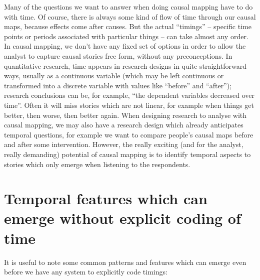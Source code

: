 \documentclass[
]{book}
\begin{document}
Many of the questions we want to answer when doing causal mapping have to do with time. Of course, there is always some kind of flow of time through our causal maps, because effects come after causes. But the actual ``timings'' -- specific time points or periods associated with particular things -- can take almost any order. In causal mapping, we don't have any fixed set of options in order to allow the analyst to capture causal stories free form, without any preconceptions. In quantitative research, time appears in research designs in quite straightforward ways, usually as a continuous variable (which may be left continuous or transformed into a discrete variable with values like ``before'' and ``after''); research conclusions can be, for example, ``the dependent variables decreased over time''. Often it will miss stories which are not linear, for example when things get better, then worse, then better again. When designing research to analyse with causal mapping, we may also have a research design which already anticipates temporal questions, for example we want to compare people's causal maps before and after some intervention. However, the really exciting (and for the analyst, really demanding) potential of causal mapping is to identify temporal aspects to stories which only emerge when listening to the respondents.

\hypertarget{temporal-features-which-can-emerge-without-explicit-coding-of-time}{%
\section{Temporal features which can emerge without explicit coding of time}\label{temporal-features-which-can-emerge-without-explicit-coding-of-time}}

It is useful to note some common patterns and features which can emerge even before we have any system to explicitly code timings:
\end{document}
